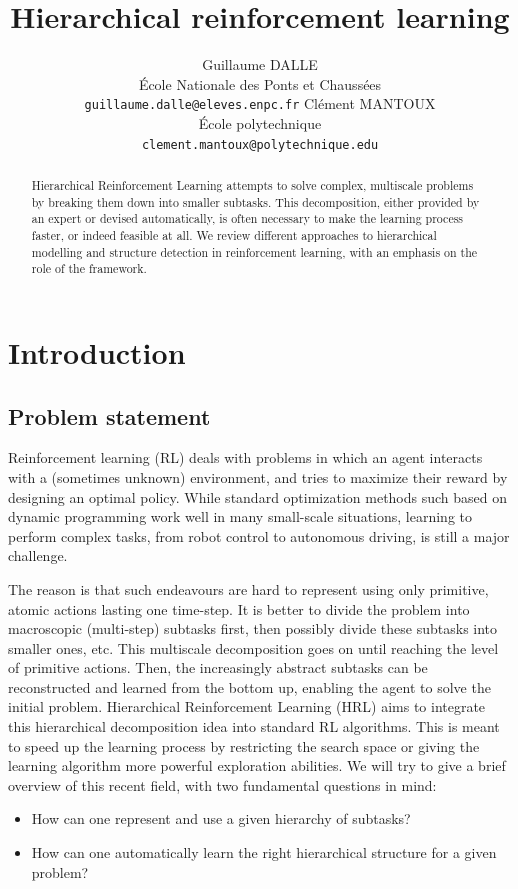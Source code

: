 \documentclass{article}
\title{Hierarchical reinforcement learning}
\author{%
  Guillaume DALLE \\
  École Nationale des Ponts et Chaussées \\
  \texttt{guillaume.dalle@eleves.enpc.fr} 
  \And
  Clément MANTOUX \\
  École polytechnique \\
  \texttt{clement.mantoux@polytechnique.edu}
}
\begin{document}

\maketitle

\begin{abstract}

Hierarchical Reinforcement Learning attempts to solve complex, multiscale problems by breaking them down into smaller subtasks. This decomposition, either provided by an expert or devised automatically, is often necessary to make the learning process faster, or indeed feasible at all. We review different approaches to hierarchical modelling and structure detection in reinforcement learning, with an emphasis on the role of the framework.

\end{abstract}

\section{Introduction}  \label{intro}

\subsection{Problem statement}

Reinforcement learning (RL) deals with problems in which an agent interacts with a (sometimes unknown) environment, and tries to maximize their reward by designing an optimal policy. While standard optimization methods such based on dynamic programming work well in many small-scale situations, learning to perform complex tasks, from robot control to autonomous driving, is still a major challenge.

The reason is that such endeavours are hard to represent using only primitive, atomic actions lasting one time-step. It is better to divide the problem into macroscopic (multi-step) subtasks first, then possibly divide these subtasks into smaller ones, etc.  This multiscale decomposition goes on until reaching the level of primitive actions. Then, the increasingly abstract subtasks can be reconstructed and learned from the bottom up, enabling the agent to solve the initial problem. 
Hierarchical Reinforcement Learning (HRL) aims to integrate this hierarchical decomposition idea into standard RL algorithms. This is meant to speed up the learning process by restricting the search space or giving the learning algorithm more powerful exploration abilities. We will try to give a brief overview of this recent field, with two fundamental questions in mind:
\begin{itemize}
    \item How can one represent and use a given hierarchy of subtasks?
    \item How can one automatically learn the right hierarchical structure for a given problem? 
\end{itemize}
\end{document}
